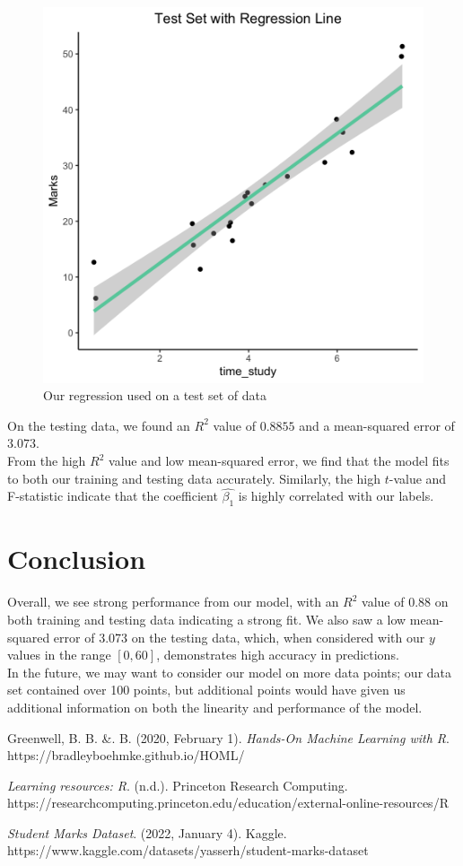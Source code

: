\documentclass{article}
\begin{document}
\begin{figure}[h]
    \includegraphics[width=0.75\linewidth]{imgs/Test_Set_With_Regression_Line.png}
    \caption{Our regression used on a test set of data}
    \label{fig:testsSet}
\end{figure}

\noindent On the testing data, we found an $R^2$ value of $0.8855$ and a mean-squared error of $3.073$. \\

\noindent From the high $R^2$ value and low mean-squared error, we find that the model fits to both our training and testing data accurately. Similarly, the high $t$-value and F-statistic indicate that the coefficient $\hat{\beta_1}$ is highly correlated with our labels.

\section{Conclusion}

Overall, we see strong performance from our model, with an $R^2$ value of 0.88 on both training and testing data indicating a strong fit. We also saw a low mean-squared error of 3.073 on the testing data, which, when considered with our $y$ values in the range $[0,60]$, demonstrates high accuracy in predictions. \\

\noindent In the future, we may want to consider our model on more data points; our data set contained over 100 points, but additional points would have given us additional information on both the linearity and performance of the model.\textbf{}

\begin{thebibliography}{9}

Greenwell, B. B. \&. B. (2020, February 1). \emph{Hands-On Machine Learning with R}\textbf{}. https://bradleyboehmke.github.io/HOML/

\emph{Learning resources: R}. (n.d.). Princeton Research Computing. https://researchcomputing.princeton.edu/education/external-online-resources/R


\emph{Student Marks Dataset}. (2022, January 4). Kaggle. https://www.kaggle.com/datasets/yasserh/student-marks-dataset


\end{thebibliography}
\end{document}
